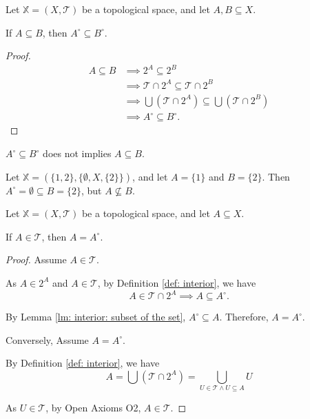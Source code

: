 \begin{lemma}
	Let $\mathbb X = (X, \mathcal T)$ be a topological space, and let $A, B \subseteq X$.
	
	If $A \subseteq B$, then $A^\circ \subseteq B^\circ$.
	
	\begin{proof}
		$$
		\begin{aligned}
			A \subseteq B &\implies 2^A \subseteq 2^B \\
			&\implies \mathcal T \cap 2^A \subseteq \mathcal T \cap 2^B \\
			&\implies \bigcup (\mathcal T \cap 2^A) \subseteq \bigcup (\mathcal T \cap 2^B) \\
			&\implies A^\circ \subseteq B^\circ.
		\end{aligned}
		$$
	\end{proof}
\end{lemma}


\begin{note}
	$A^\circ \subseteq B^\circ$ does not implies $A \subseteq B$.
	
	Let $\mathbb X = (\{1,2\}, \{\emptyset, X, \{2\} \})$, and let $A = \{1\}$ and $B = \{2\}$. Then $A^\circ = \emptyset \subseteq B = \{2\}$, but $A \not \subseteq B$.
\end{note}


\begin{lemma}
	Let $\mathbb X = (X, \mathcal T)$ be a topological space, and let $A \subseteq X$.
	
	If $A \in \mathcal T$, then $A = A^\circ$.
	
	\begin{proof}
		Assume $A \in \mathcal T$.
		
		As $A \in 2^A$ and $A \in \mathcal T$, by Definition \ref{def: interior}, we have
		$$
		A \in \mathcal T \cap 2^A \implies A \subseteq A^\circ.
		$$
		
		By Lemma \ref{lm: interior: subset of the set}, $A^\circ \subseteq A$. Therefore, $A = A^\circ$.
		\qedlm
		
		Conversely, Assume $A = A^\circ$.
		
		By Definition \ref{def: interior}, we have
		$$
		A = \bigcup (\mathcal T \cap 2^A) = \bigcup_{U \in \mathcal T \land U \subseteq A} U
		$$
		
		As $U \in \mathcal T$, by Open Axioms O2, $A \in \mathcal T$.
	\end{proof}
\end{lemma}


